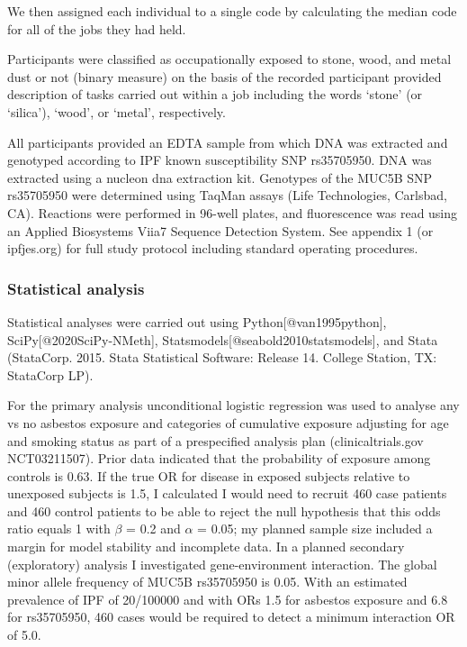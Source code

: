 We then assigned each individual to a single code by calculating the
median code for all of the jobs they had held.

Participants were classified as occupationally exposed to stone, wood,
and metal dust or not (binary measure) on the basis of the recorded
participant provided description of tasks carried out within a job
including the words `stone' (or `silica'), `wood', or `metal',
respectively.

All participants provided an EDTA sample from which DNA was extracted
and genotyped according to IPF known susceptibility SNP rs35705950. DNA
was extracted using a nucleon dna extraction kit. Genotypes of the MUC5B
SNP rs35705950 were determined using TaqMan assays (Life Technologies,
Carlsbad, CA). Reactions were performed in 96-well plates, and
fluorescence was read using an Applied Biosystems Viia7 Sequence
Detection System. See appendix 1 (or ipfjes.org) for full study protocol
including standard operating procedures.

\hypertarget{statistical-analysis}{%
\subsubsection{Statistical analysis}\label{statistical-analysis}}

Statistical analyses were carried out using Python{[}@van1995python{]},
SciPy{[}@2020SciPy-NMeth{]}, Statsmodels{[}@seabold2010statsmodels{]},
and Stata (StataCorp. 2015. Stata Statistical Software: Release 14.
College Station, TX: StataCorp LP).

For the primary analysis unconditional logistic regression was used to
analyse any vs no asbestos exposure and categories of cumulative
exposure adjusting for age and smoking status as part of a prespecified
analysis plan (clinicaltrials.gov NCT03211507). Prior data indicated
that the probability of exposure among controls is 0.63. If the true OR
for disease in exposed subjects relative to unexposed subjects is 1.5, I
calculated I would need to recruit 460 case patients and 460 control
patients to be able to reject the null hypothesis that this odds ratio
equals 1 with \ensuremath{\beta} = 0.2 and \ensuremath{\alpha} = 0.05;
my planned sample size included a margin for model stability and
incomplete data. In a planned secondary (exploratory) analysis I
investigated gene-environment interaction. The global minor allele
frequency of MUC5B rs35705950 is 0.05. With an estimated prevalence of
IPF of 20/100000 and with ORs 1.5 for asbestos exposure and 6.8 for
rs35705950, 460 cases would be required to detect a minimum interaction
OR of 5.0.

